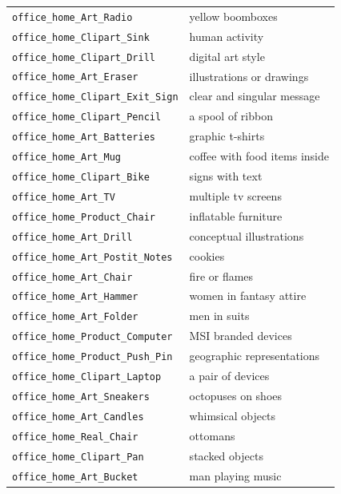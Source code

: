 \documentclass{article} %
\begin{document}
\begin{longtable}{p{} p{}}
\texttt{office\_home\_Art\_Radio} & yellow boomboxes \\
\texttt{office\_home\_Clipart\_Sink} & human activity \\
\texttt{office\_home\_Clipart\_Drill} & digital art style \\
\texttt{office\_home\_Art\_Eraser} & illustrations or drawings \\
\texttt{office\_home\_Clipart\_Exit\_Sign} & clear and singular message \\
\texttt{office\_home\_Clipart\_Pencil} & a spool of ribbon \\
\texttt{office\_home\_Art\_Batteries} & graphic t-shirts \\
\texttt{office\_home\_Art\_Mug} & coffee with food items inside \\
\texttt{office\_home\_Clipart\_Bike} & signs with text \\
\texttt{office\_home\_Art\_TV} & multiple tv screens \\
\texttt{office\_home\_Product\_Chair} & inflatable furniture \\
\texttt{office\_home\_Art\_Drill} & conceptual illustrations \\
\texttt{office\_home\_Art\_Postit\_Notes} & cookies \\
\texttt{office\_home\_Art\_Chair} & fire or flames \\
\texttt{office\_home\_Art\_Hammer} & women in fantasy attire \\
\texttt{office\_home\_Art\_Folder} & men in suits \\
\texttt{office\_home\_Product\_Computer} & MSI branded devices \\
\texttt{office\_home\_Product\_Push\_Pin} & geographic representations \\
\texttt{office\_home\_Clipart\_Laptop} & a pair of devices \\
\texttt{office\_home\_Art\_Sneakers} & octopuses on shoes \\
\texttt{office\_home\_Art\_Candles} & whimsical objects \\
\texttt{office\_home\_Real\_Chair} & ottomans \\
\texttt{office\_home\_Clipart\_Pan} & stacked objects \\
\texttt{office\_home\_Art\_Bucket} & man playing music \\


\end{longtable}
\end{document}
